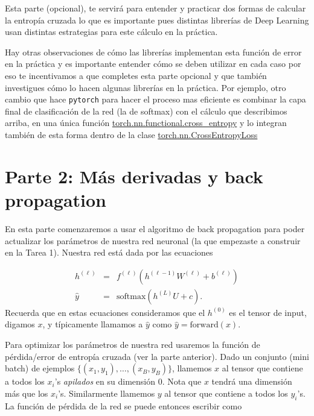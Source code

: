 \documentclass[11pt]{article}
\begin{document}
    Esta parte (opcional), te servirá para entender y practicar dos formas
de calcular la entropía cruzada lo que es importante pues distintas
librerías de Deep Learning usan distintas estrategias para este cálculo
en la práctica.

Hay otras observaciones de cómo las librerías implementan esta función
de error en la práctica y es importante entender cómo se deben utilizar
en cada caso por eso te incentivamos a que completes esta parte opcional
y que también investigues cómo lo hacen algunas librerías en la
práctica. Por ejemplo, otro cambio que hace \texttt{pytorch} para hacer
el proceso mas eficiente es combinar la capa final de clasificación de
la red (la de softmax) con el cálculo que describimos arriba, en una
única función
\href{https://pytorch.org/docs/stable/nn.functional.html\#torch.nn.functional.cross_entropy}{torch.nn.functional.cross\_entropy}
y lo integran también de esta forma dentro de la clase
\href{https://pytorch.org/docs/stable/generated/torch.nn.CrossEntropyLoss.html\#torch.nn.CrossEntropyLoss}{torch.nn.CrossEntropyLoss}

    \hypertarget{parte-2-muxe1s-derivadas-y-back-propagation}{%
\section{Parte 2: Más derivadas y back
propagation}\label{parte-2-muxe1s-derivadas-y-back-propagation}}

En esta parte comenzaremos a usar el algoritmo de back propagation para
poder actualizar los parámetros de nuestra red neuronal (la que
empezaste a construir en la Tarea 1). Nuestra red está dada por las
ecuaciones

\begin{eqnarray*}
h^{(\ell)} & = & f^{(\ell)}(h^{(\ell-1)} W^{(\ell)}+b^{(\ell)}) \\
\hat{y} & = & \text{softmax}(h^{(L)}U+c).
\end{eqnarray*} Recuerda que en estas ecuaciones consideramos que el
\(h^{(0)}\) es el tensor de input, digamos \(x\), y típicamente llamamos
a \(\hat{y}\) como \(\hat{y}=\text{forward}(x)\).

Para optimizar los parámetros de nuestra red usaremos la función de
pérdida/error de entropía cruzada (ver la parte anterior). Dado un
conjunto (mini batch) de ejemplos \(\{(x_1,y_1),\ldots,(x_B,y_B)\}\),
llamemos \(x\) al tensor que contiene a todos los \(x_i\)'s
\emph{apilados} en su dimensión \(0\). Nota que \(x\) tendrá una
dimensión más que los \(x_i\)'s. Similarmente llamemos \(y\) al tensor
que contiene a todos los \(y_i\)'s. La función de pérdida de la red se
puede entonces escribir como
\end{document}
